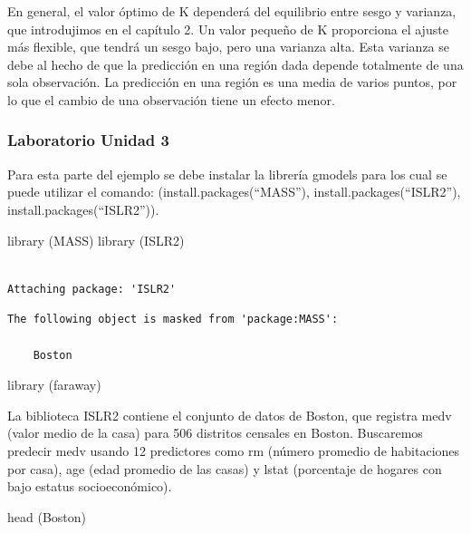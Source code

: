 \documentclass[
  letterpaper,
  DIV=11,
  numbers=noendperiod]{scrartcl}
\newenvironment{Shaded}{\begin{snugshade}}{\end{snugshade}}
\newcommand{\FunctionTok}[1]{\textcolor[rgb]{0.28,0.35,0.67}{#1}}
\newcommand{\NormalTok}[1]{\textcolor[rgb]{0.00,0.23,0.31}{#1}}
\begin{document}
En general, el valor óptimo de K dependerá del equilibrio entre sesgo y
varianza, que introdujimos en el capítulo 2. Un valor pequeño de K
proporciona el ajuste más flexible, que tendrá un sesgo bajo, pero una
varianza alta. Esta varianza se debe al hecho de que la predicción en
una región dada depende totalmente de una sola observación. La
predicción en una región es una media de varios puntos, por lo que el
cambio de una observación tiene un efecto menor.

\hypertarget{laboratorio-unidad-3}{%
\subsubsection{Laboratorio Unidad 3}\label{laboratorio-unidad-3}}

Para esta parte del ejemplo se debe instalar la librería gmodels para
los cual se puede utilizar el comando: (install.packages(``MASS''),
install.packages(``ISLR2''), install.packages(``ISLR2'')).

\begin{Shaded}
\begin{Highlighting}[]
\FunctionTok{library}\NormalTok{ (MASS)}
\FunctionTok{library}\NormalTok{ (ISLR2)}
\end{Highlighting}
\end{Shaded}

\begin{verbatim}

Attaching package: 'ISLR2'
\end{verbatim}

\begin{verbatim}
The following object is masked from 'package:MASS':

    Boston
\end{verbatim}

\begin{Shaded}
\begin{Highlighting}[]
\FunctionTok{library}\NormalTok{ (faraway)}
\end{Highlighting}
\end{Shaded}

La biblioteca ISLR2 contiene el conjunto de datos de Boston, que
registra medv (valor medio de la casa) para 506 distritos censales en
Boston. Buscaremos predecir medv usando 12 predictores como rm (número
promedio de habitaciones por casa), age (edad promedio de las casas) y
lstat (porcentaje de hogares con bajo estatus socioeconómico).

\begin{Shaded}
\begin{Highlighting}[]
\FunctionTok{head}\NormalTok{ (Boston)}
\end{Highlighting}
\end{Shaded}
\end{document}
